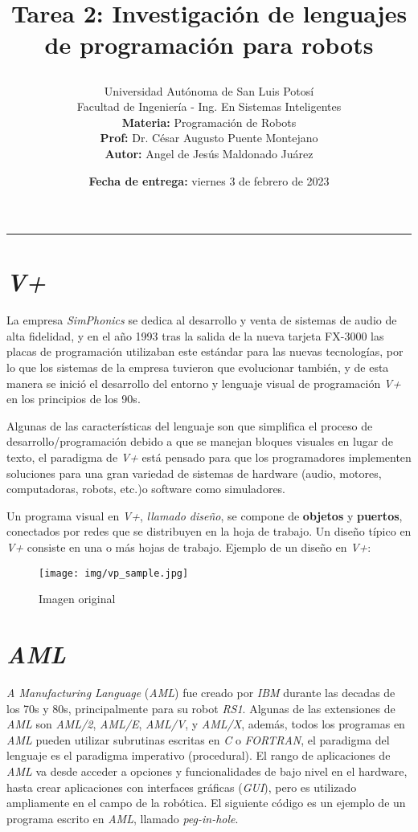 \documentclass[a4paper, 12pt]{article}
\title{
    \vspace{-3cm}Tarea 2: Investigación de lenguajes de programación
    para robots
    \author{
        Universidad Autónoma de San Luis Potosí\\
        Facultad de Ingeniería - Ing. En Sistemas Inteligentes\\
        \textbf{Materia:} Programación de Robots\\
        \textbf{Prof:} Dr. César Augusto Puente Montejano\\
        \textbf{Autor:} Angel de Jesús Maldonado Juárez
    }
    \date{\textbf{Fecha de entrega:} viernes 3 de febrero de 2023}
}
\begin{document}
\maketitle

\hrule

\section*{\emph{V+}}
La empresa \emph{SimPhonics} se dedica al desarrollo y venta de
sistemas de audio de alta fidelidad, y en el año 1993 tras la salida
de la nueva tarjeta FX-3000 las placas de programación utilizaban este
estándar para las nuevas tecnologías, por lo que los sistemas de la
empresa tuvieron que evolucionar también, y de esta manera se inició
el desarrollo del entorno y lenguaje visual de programación \emph{V+}
en los principios de los 90s.

Algunas de las características del lenguaje son que simplifica el
proceso de desarrollo/programación debido a que se manejan bloques
visuales en lugar de texto, el paradigma de \emph{V+} está pensado para
que los programadores implementen soluciones para una gran variedad de
sistemas de hardware (audio, motores, computadoras, robots, etc.)o
software como simuladores.

Un programa visual en \emph{V+}, \emph{llamado diseño}, se compone de
\textbf{objetos} y \textbf{puertos}, conectados por redes que se
distribuyen en la hoja de trabajo. Un diseño típico en \emph{V+} consiste
en una o más hojas de trabajo. Ejemplo de un diseño en \emph{V+}:

\begin{figure}[!ht]
    \centering
    \texttt{[image: img/vp\_sample.jpg]}
    \caption{Imagen original}
\end{figure}

\section*{\emph{AML}}
\emph{A Manufacturing Language} (\emph{AML}) fue creado por \emph{IBM} durante
las decadas de los 70s y 80s, principalmente para su robot \emph{RS1}. Algunas
de las extensiones de \emph{AML} son \emph{AML/2}, \emph{AML/E}, \emph{AML/V},
y \emph{AML/X}, además, todos los programas en \emph{AML} pueden utilizar
subrutinas escritas en \emph{C} o \emph{FORTRAN}, el paradigma del lenguaje es
el paradigma imperativo (procedural). El rango de aplicaciones de \emph{AML}
va desde acceder a opciones y funcionalidades de bajo nivel en el hardware, hasta
crear aplicaciones con interfaces gráficas (\emph{GUI}), pero es utilizado
ampliamente en el campo de la robótica.
El siguiente código es un ejemplo de un programa escrito en \emph{AML}, llamado
\emph{peg-in-hole}.
\end{document}
